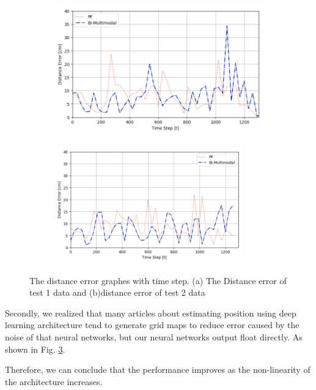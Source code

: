 \documentclass[letterpaper, 10 pt, conference]{ieeeconf}  %
\begin{document}
 \begin{figure}[h]
 	\centering
 	\begin{subfigure}[b]{.50\textwidth}
 		\centering
 		\includegraphics[width=.9\textwidth]{PF_multimodal_error1}
 		\label{fig:error1} 	
 		\caption{}
 	\end{subfigure}%
 	\begin{subfigure}[b]{.50\textwidth}
 		\centering
 		\includegraphics[width=0.9\textwidth]{PF_multimodal_error2}
 		\label{fig:error2} 	
 		\caption{}
 	\end{subfigure}
 	\caption{The distance error graphes with time step. (a) The Distance error of test 1 data  and (b)distance error of test 2 data}
 	\label{fig:error}
 \end{figure} 
  
 Secondly, we realized that many articles about estimating position using deep learning architecture tend to generate grid maps to reduce error caused by the noise of that neural networks, but our neural networks output float directly. As shown in Fig. \ref{fig:error}. 
 
 Therefore, we can conclude that the performance improves as the non-linearity of the architecture increases.
 
\end{document}
